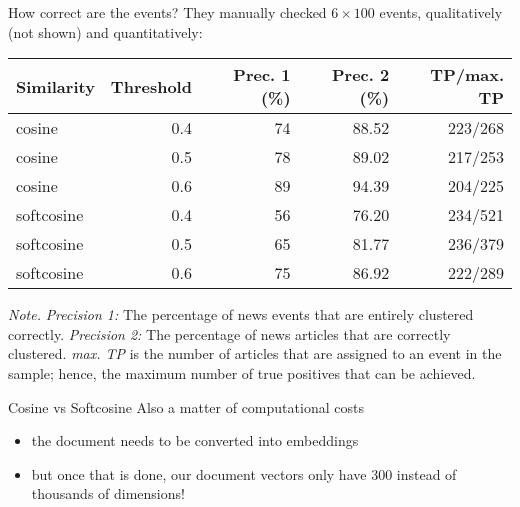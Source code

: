 \begin{frame}[fragile]{How correct are the events?}
  They manually checked $6 \times 100$ events, qualitatively (not shown) and quantitatively:
  \begin{table}
    \begin{tabular}{lrrrr}
      \footnotesize
      \textbf{Similarity}   & \textbf{Threshold} & \textbf{Prec. 1 (\%)} & \textbf{Prec. 2 (\%)} &\textbf{TP/max. TP}  \\
      \midrule
      cosine              & 0.4       & 74        & 88.52     & 223/268 \\
      cosine              & 0.5       & 78        & 89.02     & 217/253 \\
      cosine              & 0.6       & 89        & 94.39     & 204/225 \\
      softcosine          & 0.4       & 56        & 76.20     & 234/521 \\
      softcosine          & 0.5       & 65        & 81.77     & 236/379 \\
      softcosine          & 0.6       & 75        & 86.92     & 222/289 \\
      
    \end{tabular}
	\end{table}
	\tiny 
	\textit{Note.} \textit{Precision 1:} The percentage of news events that are entirely clustered correctly. \textit{Precision 2:} The percentage of news articles that are correctly clustered. \textit{max. TP} is the number of articles that are assigned to an event in the sample; hence, the maximum number of true positives that can be achieved.\\
	
\end{frame}

\begin{frame}{Cosine vs Softcosine}
	Also a matter of computational costs
	\begin{itemize}
	\item the document needs to be converted into embeddings
	\item but once that is done, our document vectors only have 300 instead of thousands of dimensions!
	\end{itemize}
\end{frame}

